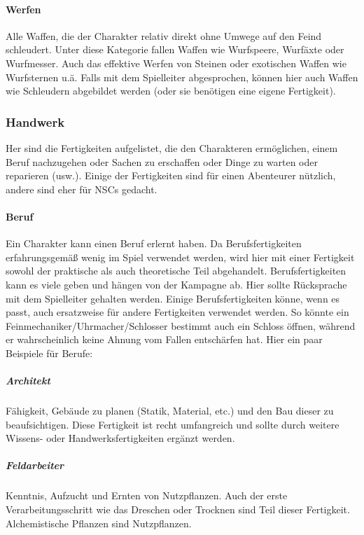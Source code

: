 \documentclass{article}
\begin{document}
\paragraph{Werfen}

Alle Waffen, die der Charakter relativ direkt ohne Umwege auf den Feind schleudert. Unter diese Kategorie fallen
Waffen wie Wurfspeere, Wurfäxte oder Wurfmesser. Auch das effektive Werfen von Steinen oder exotischen Waffen wie
Wurfsternen u.ä. Falls mit dem Spielleiter abgesprochen, können hier auch Waffen wie Schleudern abgebildet werden
(oder sie benötigen eine eigene Fertigkeit).

\subsubsection{Handwerk}

Her sind die Fertigkeiten aufgelistet, die den Charakteren ermöglichen, einem Beruf nachzugehen oder Sachen zu
erschaffen oder Dinge zu warten oder reparieren (usw.). Einige der Fertigkeiten sind für einen Abenteurer nützlich,
andere sind eher für NSCs gedacht.

\paragraph{Beruf}

Ein Charakter kann einen Beruf erlernt haben. Da Berufsfertigkeiten erfahrungsgemäß wenig im Spiel verwendet werden,
wird hier mit einer Fertigkeit sowohl der praktische als auch theoretische Teil abgehandelt. Berufsfertigkeiten kann
es viele geben und hängen von der Kampagne ab. Hier sollte Rücksprache mit dem Spielleiter gehalten werden.
Einige Berufsfertigkeiten könne, wenn es passt, auch ersatzweise für andere Fertigkeiten verwendet werden. So könnte
ein Feinmechaniker/Uhrmacher/Schlosser bestimmt auch ein Schloss öffnen, während er wahrscheinlich keine Ahnung vom
Fallen entschärfen hat. Hier ein paar Beispiele für Berufe:

\subparagraph{Architekt}

Fähigkeit, Gebäude zu planen (Statik, Material, etc.) und den Bau dieser zu beaufsichtigen. Diese Fertigkeit ist recht
umfangreich und sollte durch weitere Wissens- oder Handwerksfertigkeiten ergänzt werden.

\subparagraph{Feldarbeiter}

Kenntnis, Aufzucht und Ernten von Nutzpflanzen. Auch der erste Verarbeitungsschritt wie das Dreschen oder Trocknen
sind Teil dieser Fertigkeit. Alchemistische Pflanzen sind Nutzpflanzen.
\end{document}
